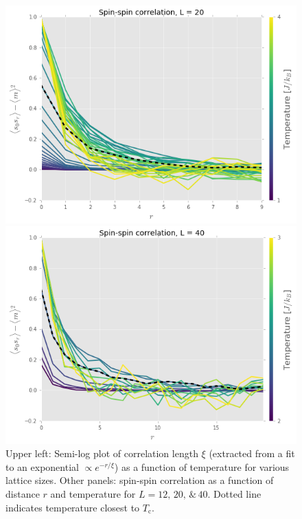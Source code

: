 \documentclass[11pt, oneside]{article}
\begin{document}
\begin{figure}
    \vspace*{0cm} %

    \begin{minipage}{0.47\textwidth}
    \includegraphics[width=\linewidth]{img/2D/spinspin20}
    \end{minipage}
    \hspace{\fill} %
    \begin{minipage}{0.47\textwidth}
    \includegraphics[width=\linewidth]{img/2D/spinspin40}
    \end{minipage}
\caption{Upper left: Semi-log plot of correlation length $\xi$ (extracted from a fit to an exponential $\propto e^{-r/\xi}$) as a function of temperature for various lattice sizes. Other panels: spin-spin correlation as a function of distance $r$ and temperature for $L=12,\,20,\,\&\,40$. Dotted line indicates temperature closest to $T_\text{c}$.}
\label{fig:2D_corr}
\end{figure}
\end{document}
